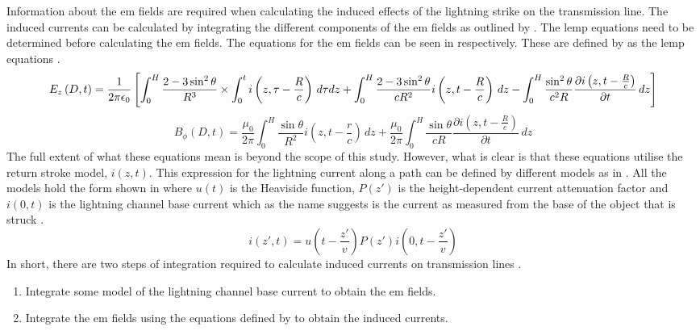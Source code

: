 Information about the \gls{em} fields are required when calculating the induced effects of the lightning strike on the transmission line. The induced currents can be calculated by integrating the different components of the \gls{em} fields as outlined by \citeauthor{Agrawal1980} \cite{Agrawal1980}. The \gls{lemp} equations need to be determined before calculating the \gls{em} fields. The equations for the \gls{em} fields can be seen in  respectively. These are defined by \citeauthor{Uman1975} as the \gls{lemp} equations \cite{Uman1975}.
\begin{dmath}
    E_z \left( D,t \right)=\frac{1}{2\pi\epsilon_0}\left[\int_{0}^{H}\frac{2 - 3\sin^{2}{\theta}}{R^3} \times \int_{0}^{t} i \left( z, \tau - \frac{R}{c} \right) \, d\tau dz \\ + \int_{0}^{H} \frac{2 - 3\sin^{2}{\theta}}{c R^2} i \left( z, t - \frac{R}{c} \right) \, dz - \int_{0}^{H} \frac{\sin^{2}{\theta}}{c^2 R} \frac{\partial i\left ( z, t - \frac{R}{c} \right )}{\partial t} \, dz \right ]
    \label{eqn:e_field}
\end{dmath}
\begin{dmath}
    B_{\phi} \left( D,t \right) = \frac{\mu_0}{2\pi} \int_{0}^{H} \frac{\sin{\theta}}{R^2} i \left ( z, t - \frac{r}{c} \right ) \, dz + \frac{\mu_0}{2\pi} \int_{0}^{H} \frac{\sin{\theta}}{cR} \frac{\partial i \left ( z, t - \frac{R}{c} \right )}{\partial t} \, dz
    \label{eqn:b_field}
\end{dmath}
The full extent of what these equations mean is beyond the scope of this study. However, what is clear is that these equations utilise the return stroke model, $i \left( z, t \right)$. This expression for the lightning current along a path can be defined by different models as in \cite{Paolone2009,ZhangFeizhouandLiuShanghe2002,Nucci2003}. All the models hold the form shown in  where $u(t)$ is the Heaviside function, $P(z')$ is the height-dependent current attenuation factor and $i(0,t)$ is the lightning channel base current which as the name suggests is the current as measured from the base of the object that is struck \cite{Paolone2009,ZhangFeizhouandLiuShanghe2002,Javor2011}.
\begin{equation}
    i(z',t)=u\left( t - \frac{z'}{v}\right) P \left( z' \right) i \left( 0,t - \frac{z'}{v} \right)
    \label{eqn:rsm}
\end{equation}
In short, there are two steps of integration required to calculate induced currents on transmission lines \cite{Nucci2010,Nucci2003,Paolone2009}.
\begin{enumerate}
    \item Integrate some model of the lightning channel base current to obtain the \gls{em} fields.
    \item Integrate the \gls{em} fields using the equations defined by \citeauthor{Agrawal1980} to obtain the induced currents.
\end{enumerate}

